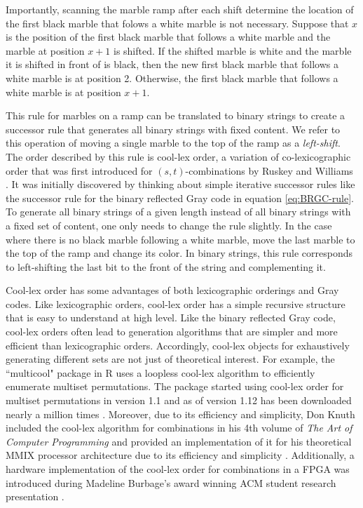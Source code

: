 Importantly, scanning the marble ramp after each shift determine the location of the first black marble that folows a white marble is not necessary.  
Suppose that $x$ is the position of the first black marble that follows a white marble and the marble at position $x+1$ is shifted.  If the shifted marble is white and the marble it is shifted in front of is black, then the new first black marble that follows a white marble is at position 2.  Otherwise, the first black marble that follows a white marble is at position $x+1$.  

This rule for marbles on a ramp can be translated to binary strings to create a successor rule that generates all binary strings with fixed content.  We refer to this operation of moving a single marble to the top of the ramp as a \emph{left-shift}.
The order described by this rule is 
cool-lex order, a variation of co-lexicographic order that was first introduced for $(s,t)$-combinations by Ruskey and Williams \cite{ruskey2005generating,ruskey2009generating}.  It was initially discovered by thinking about simple iterative successor rules like the successor rule for the binary reflected Gray code in equation \eqref{eq:BRGC-rule}. To generate all binary strings of a given length instead of all binary strings with a fixed set of content, one only needs to change the rule slightly.  In the case where there is no black marble following a white marble, move the last marble to the top of the ramp and change its color.  In binary strings, this rule corresponds to left-shifting the last bit to the front of the string and complementing it.

Cool-lex order has some advantages of both lexicographic orderings and Gray codes.  Like lexicographic orders, cool-lex order has a simple recursive structure that is easy to understand at  high level.  
Like the binary reflected Gray code, cool-lex orders often lead to generation algorithms that are simpler and more efficient than lexicographic orders.  Accordingly, cool-lex objects for exhaustively generating different sets are not just of theoretical interest.
For example, the ``multicool" package in R uses a loopless cool-lex algorithm to efficiently enumerate multiset permutations.   The package started using cool-lex order for multiset permutations in version 1.1 and as of version 1.12 has been downloaded nearly a million times \cite{multicool_2021}.  Moreover, due to its efficiency and simplicity, Don Knuth included the cool-lex algorithm for combinations in his 4th volume of \emph{The Art of Computer Programming} and provided an implementation of it for his theoretical MMIX processor architecture due to its efficiency and simplicity \cite{knuth2015art}.  Additionally, a hardware implementation of the cool-lex order for combinations in a FPGA was introduced during Madeline Burbage's award winning ACM student research presentation \cite{burbage2020cool}.

